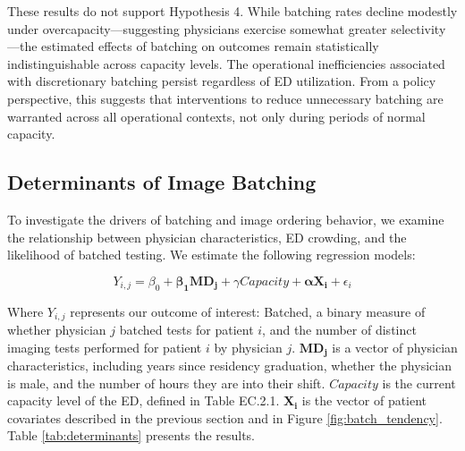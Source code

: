 \documentclass[,,blindrev]{informs}
\begin{document}
These results do not support Hypothesis 4. While batching rates decline
modestly under overcapacity---suggesting physicians exercise somewhat
greater selectivity---the estimated effects of batching on outcomes
remain statistically indistinguishable across capacity levels. The
operational inefficiencies associated with discretionary batching
persist regardless of ED utilization. From a policy perspective, this
suggests that interventions to reduce unnecessary batching are warranted
across all operational contexts, not only during periods of normal
capacity.

\subsection{Determinants of Image Batching}\label{sec:determinants}

To investigate the drivers of batching and image ordering behavior, we
examine the relationship between physician characteristics, ED crowding,
and the likelihood of batched testing. We estimate the following
regression models:

\small

\begin{equation}
Y_{i,j} = \beta_0 + \mathbf{\beta_1 MD_j} + \gamma Capacity + \mathbf{\alpha X_{i}} + \epsilon_i
\end{equation} \normalsize

Where \(Y_{i,j}\) represents our outcome of interest: Batched, a binary
measure of whether physician \(j\) batched tests for patient \(i\), and
the number of distinct imaging tests performed for patient \(i\) by
physician \(j\). \(\mathbf{MD_j}\) is a vector of physician
characteristics, including years since residency graduation, whether the
physician is male, and the number of hours they are into their shift.
\(Capacity\) is the current capacity level of the ED, defined in Table
EC.2.1. \(\mathbf{X_{i}}\) is the vector of patient covariates described
in the previous section and in Figure \ref{fig:batch_tendency}. Table
\ref{tab:determinants} presents the results.
\end{document}
